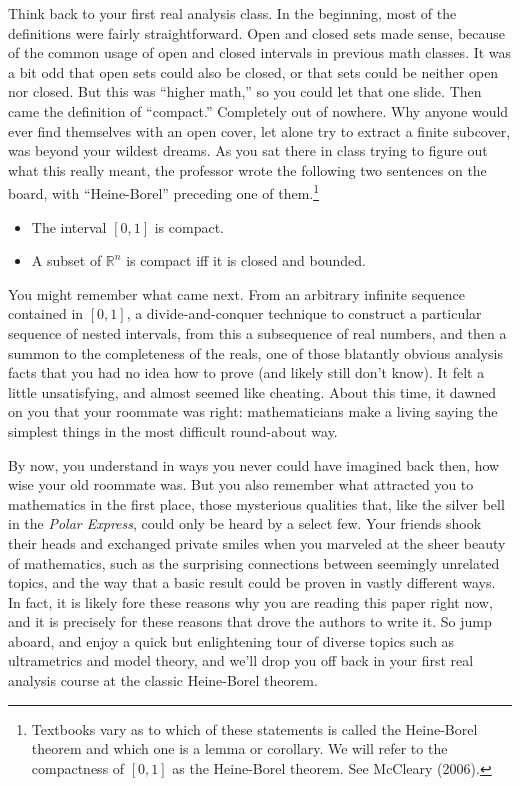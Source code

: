 \documentclass[12pt]{amsart}
\def\R{\mathbb{R}}
\theoremstyle{plain}
\theoremstyle{definition}
\theoremstyle{remark}
\begin{document}
Think back to your first real analysis class. In the beginning, most
of the definitions were fairly straightforward. Open and closed sets
made sense, because of the common usage of open and closed intervals
in previous math classes. It was a bit odd that open sets could also
be closed, or that sets could be neither open nor closed. But this was
``higher math,'' so you could let that one slide. Then came the
definition of ``compact.'' Completely out of nowhere. Why anyone would
ever find themselves with an open cover, let alone try to extract a
finite subcover, was beyond your wildest dreams. As you sat there in
class trying to figure out what this really meant, the professor wrote
the following two sentences on the board, with ``Heine-Borel''
preceding one of them.\footnote{Textbooks vary as to which of these
statements is called the Heine-Borel theorem and which one is a lemma
or corollary. We will refer to the compactness of $[0,1]$ as the
Heine-Borel theorem. See McCleary (2006).}
\begin{itemize}
  \item The interval $[0,1]$ is compact.
  \item A subset of $\R^n$ is compact iff it is closed and bounded. 
\end{itemize}
You might remember what came next. From an arbitrary infinite sequence
contained in $[0,1]$, a divide-and-conquer technique to construct a
particular sequence of nested intervals, from this a subsequence of
real numbers, and then a summon to the completeness of the reals, one
of those blatantly obvious analysis facts that you had no idea how to
prove (and likely still don't know). It felt a little unsatisfying, and
almost seemed like cheating. About this time, it dawned on you that
your roommate was right: mathematicians make a living saying the
simplest things in the most difficult round-about way.

By now, you understand in ways you never could have imagined back
then, how wise your old roommate was. But you also remember what
attracted you to mathematics in the first place, those mysterious
qualities that, like the silver bell in the \emph{Polar Express},
could only be heard by a select few. Your friends shook their heads
and exchanged private smiles when you marveled at the sheer beauty of
mathematics, such as the surprising connections between seemingly
unrelated topics, and the way that a basic result could be proven in
vastly different ways. In fact, it is likely fore these reasons why
you are reading this paper right now, and it is precisely for these
reasons that drove the authors to write it. So jump aboard, and enjoy
a quick but enlightening tour of diverse topics such as ultrametrics
and model theory, and we'll drop you off back in your first real
analysis course at the classic Heine-Borel theorem.
\end{document}
